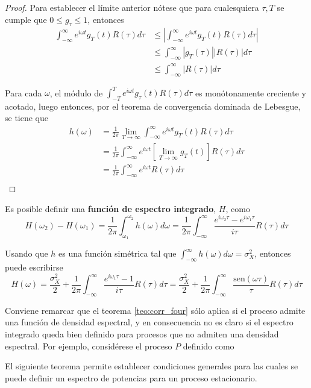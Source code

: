 \documentclass[12pt,letterpaper,draft]{book}
\newcommand{\intR}{\int_{-\infty}^{\infty}}
\newcommand{\SEN}[1]{\mathrm{sen}\left( #1 \right)}
\newcommand{\abso}[1]{\left| #1 \right|}
\begin{document}
\begin{proof}
Para establecer el límite anterior nótese que para cualesquiera $\tau, T$ se cumple que $0\leq g_\tau \leq 1$, entonces
\begin{align*}
\intR e^{i \omega t} g_T(t) R(\tau) d\tau
&\leq
\abso{\intR e^{i \omega t} g_T(t) R(\tau) d\tau } \\
&\leq
\intR \abso{g_T(\tau)} \abso{ R(\tau)} d\tau \\
&\leq
\intR \abso{ R(\tau)} d\tau 
\end{align*}

Para cada $\omega$, el módulo de $\int_{-T}^{T} e^{i \omega t} g_\tau(t) R(\tau) d\tau$ es monótonamente creciente y acotado, luego entonces, por el teorema de convergencia dominada de Lebesgue, se tiene que
\begin{align*}
h(\omega) &=
\frac{1}{2\pi} \lim_{T\rightarrow \infty}
\intR e^{i \omega t} g_T(t) R(\tau) d\tau\\
&=
\frac{1}{2\pi} 
\intR e^{i \omega t} \left[ \lim_{T\rightarrow \infty} g_T(t) \right] R(\tau) d\tau\\
&=
\frac{1}{2\pi} 
\intR e^{i \omega t} R(\tau) d\tau\\
\end{align*}
\end{proof}

Es posible definir una \textbf{función de espectro integrado}, $H$, como
\begin{equation}
H(\omega_2) - H(\omega_1) = \frac{1}{2 \pi} \int_{\omega_1}^{\omega_2} h(\omega) d\omega =
\frac{1}{2\pi} \intR \frac{e^{i \omega_2 \tau}-e^{i \omega_1 \tau}}{i \tau} R(\tau) d\tau
\end{equation}

Usando que $h$ es una función simétrica tal que $\intR h(\omega) d\omega = \sigma_X^{2}$, entonces puede escribirse
\begin{equation}
H(\omega) = \frac{\sigma_X^{2}}{2} + \frac{1}{2 \pi} \intR \frac{e^{i \omega_1 \tau}-1}{i \tau} R(\tau) d\tau = \frac{\sigma_X^{2}}{2} + \frac{1}{2 \pi} \intR \frac{\SEN{\omega \tau}}{\tau} R(\tau) d\tau
\end{equation}

Conviene remarcar que el teorema \ref{teo:corr_four} sólo aplica si el proceso admite una función de densidad espectral, y en consecuencia no es claro si el espectro integrado queda bien definido para procesos que no admiten una densidad espectral. 
%
Por ejemplo, considérese el proceso $P$ definido como 

El siguiente teorema permite establecer condiciones generales para las cuales se puede definir un espectro de potencias para un proceso estacionario.
\end{document}

